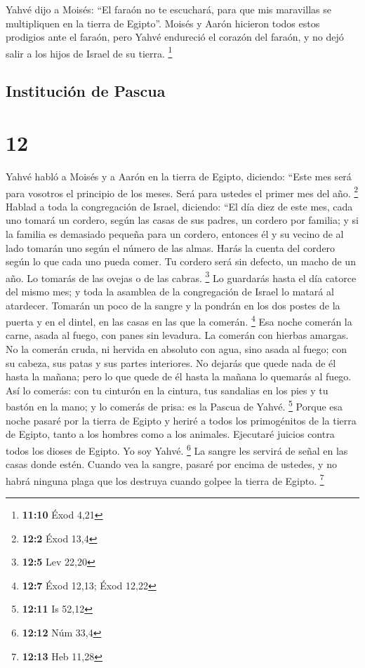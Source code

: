  Yahvé dijo a Moisés: ``El faraón no te escuchará, para
que mis maravillas se multipliquen en la tierra de Egipto''.
 Moisés y Aarón hicieron todos estos prodigios ante el
faraón, pero Yahvé endureció el corazón del faraón, y no dejó salir a
los hijos de Israel de su tierra. \footnote{\textbf{11:10} Éxod 4,21}

\hypertarget{instituciuxf3n-de-pascua}{%
\subsection{Institución de Pascua}\label{instituciuxf3n-de-pascua}}

\hypertarget{section-11}{%
\section{12}\label{section-11}}

 Yahvé habló a Moisés y a Aarón en la tierra de Egipto,
diciendo:  ``Este mes será para vosotros el principio de
los meses. Será para ustedes el primer mes del año. \footnote{\textbf{12:2}
  Éxod 13,4}  Hablad a toda la congregación de Israel,
diciendo: ``El día diez de este mes, cada uno tomará un cordero, según
las casas de sus padres, un cordero por familia;  y si la
familia es demasiado pequeña para un cordero, entonces él y su vecino de
al lado tomarán uno según el número de las almas. Harás la cuenta del
cordero según lo que cada uno pueda comer.  Tu cordero
será sin defecto, un macho de un año. Lo tomarás de las ovejas o de las
cabras. \footnote{\textbf{12:5} Lev 22,20}  Lo guardarás
hasta el día catorce del mismo mes; y toda la asamblea de la
congregación de Israel lo matará al atardecer.  Tomarán un
poco de la sangre y la pondrán en los dos postes de la puerta y en el
dintel, en las casas en las que la comerán. \footnote{\textbf{12:7} Éxod
  12,13; Éxod 12,22}  Esa noche comerán la carne, asada al
fuego, con panes sin levadura. La comerán con hierbas amargas.
 No la comerán cruda, ni hervida en absoluto con agua,
sino asada al fuego; con su cabeza, sus patas y sus partes interiores.
 No dejarás que quede nada de él hasta la mañana; pero lo
que quede de él hasta la mañana lo quemarás al fuego. 
Así lo comerás: con tu cinturón en la cintura, tus sandalias en los pies
y tu bastón en la mano; y lo comerás de prisa: es la Pascua de Yahvé.
\footnote{\textbf{12:11} Is 52,12}  Porque esa noche
pasaré por la tierra de Egipto y heriré a todos los primogénitos de la
tierra de Egipto, tanto a los hombres como a los animales. Ejecutaré
juicios contra todos los dioses de Egipto. Yo soy Yahvé. \footnote{\textbf{12:12}
  Núm 33,4}  La sangre les servirá de señal en las casas
donde estén. Cuando vea la sangre, pasaré por encima de ustedes, y no
habrá ninguna plaga que los destruya cuando golpee la tierra de Egipto.
\footnote{\textbf{12:13} Heb 11,28}

